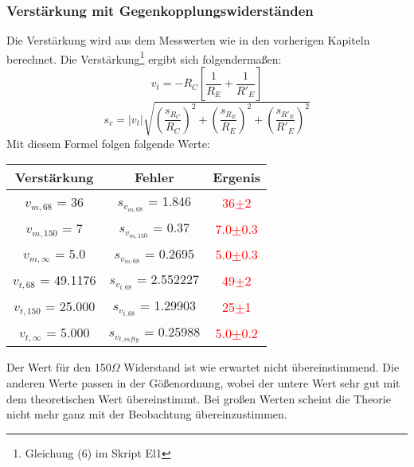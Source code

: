 \subsubsection{Verstärkung mit Gegenkopplungswiderständen}
Die Verstärkung wird aus dem Messwerten wie in den vorherigen Kapiteln berechnet.
Die Verstärkung\footnote{Gleichung (6) im Skript El1} ergibt sich folgendermaßen: 
\begin{equation*}
    v_t = -R_C[\frac{1}{R_E}+\frac{1}{R'_E}] 
\end{equation*}
\begin{equation*}
    s_v = |v_t| \sqrt{(\frac{s_{R_C}}{R_C})^2+(\frac{s_{R_E}}{R_E})^2+(\frac{s_{R'_E}}{R'_E})^2}
\end{equation*}
Mit diesem Formel folgen folgende Werte:\\
\begin{table}[h]
    \centering
    \begin{tabular}{c|c|c}
        Verstärkung & Fehler & Ergenis\\
        \hline
        $v_{m,68}$ = 36 & $s_{v_{m,68}}$ = 1.846& \textcolor{red}{36$\pm$2}\\
        $v_{m,150}$ = 7 & $s_{v_{m,150}}$ = 0.37& \textcolor{red}{7.0$\pm$0.3}\\
        $v_{m,\infty}$ = 5.0 & $s_{v_{m,68}}$ = 0.2695& \textcolor{red}{5.0$\pm$0.3}\\
        \hline
        $v_{t,68}$ = 49.1176 & $s_{v_{t,68}}$ = 2.552227& \textcolor{red}{49$\pm$2}\\
        $v_{t,150}$ = 25.000 & $s_{v_{t,68}}$ = 1.29903& \textcolor{red}{25$\pm$1}\\
        $v_{t,\infty}$ = 5.000 & $s_{v_{t,infty}}$ = 0.25988& \textcolor{red}{5.0$\pm$0.2}\\
    \end{tabular}
\end{table}
Der Wert für den 150$\Omega$ Widerstand ist wie erwartet nicht übereinstimmend. Die anderen Werte passen in der 
Gößenordnung, wobei der untere Wert sehr gut mit dem theoretischen Wert übereinstimmt. Bei großen Werten 
scheint die Theorie nicht mehr ganz mit der Beobachtung übereinzustimmen.